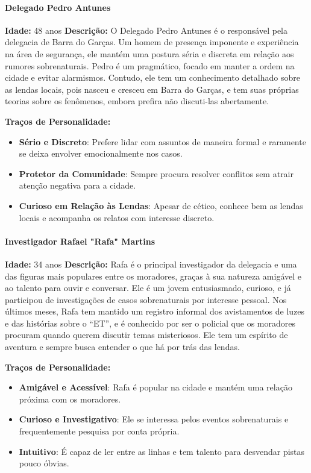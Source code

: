 \begin{personagem}  
\paragraph{Delegado Pedro Antunes}  
\textbf{Idade:} 48 anos  
\textbf{Descrição:}  
O Delegado Pedro Antunes é o responsável pela delegacia de Barra do Garças. Um homem de presença imponente e experiência na área de segurança, ele mantém uma postura séria e discreta em relação aos rumores sobrenaturais. Pedro é um pragmático, focado em manter a ordem na cidade e evitar alarmismos. Contudo, ele tem um conhecimento detalhado sobre as lendas locais, pois nasceu e cresceu em Barra do Garças, e tem suas próprias teorias sobre os fenômenos, embora prefira não discuti-las abertamente.

\textbf{Traços de Personalidade:}
\begin{itemize}
    \item \textbf{Sério e Discreto}: Prefere lidar com assuntos de maneira formal e raramente se deixa envolver emocionalmente nos casos.
    \item \textbf{Protetor da Comunidade}: Sempre procura resolver conflitos sem atrair atenção negativa para a cidade.
    \item \textbf{Curioso em Relação às Lendas}: Apesar de cético, conhece bem as lendas locais e acompanha os relatos com interesse discreto.
\end{itemize}
\end{personagem}
\begin{personagem}  
\paragraph{Investigador Rafael "Rafa" Martins}  
\textbf{Idade:} 34 anos  
\textbf{Descrição:}  
Rafa é o principal investigador da delegacia e uma das figuras mais populares entre os moradores, graças à sua natureza amigável e ao talento para ouvir e conversar. Ele é um jovem entusiasmado, curioso, e já participou de investigações de casos sobrenaturais por interesse pessoal. Nos últimos meses, Rafa tem mantido um registro informal dos avistamentos de luzes e das histórias sobre o “ET”, e é conhecido por ser o policial que os moradores procuram quando querem discutir temas misteriosos. Ele tem um espírito de aventura e sempre busca entender o que há por trás das lendas.

\textbf{Traços de Personalidade:}
\begin{itemize}
    \item \textbf{Amigável e Acessível}: Rafa é popular na cidade e mantém uma relação próxima com os moradores.
    \item \textbf{Curioso e Investigativo}: Ele se interessa pelos eventos sobrenaturais e frequentemente pesquisa por conta própria.
    \item \textbf{Intuitivo}: É capaz de ler entre as linhas e tem talento para desvendar pistas pouco óbvias.
\end{itemize}
\end{personagem}

